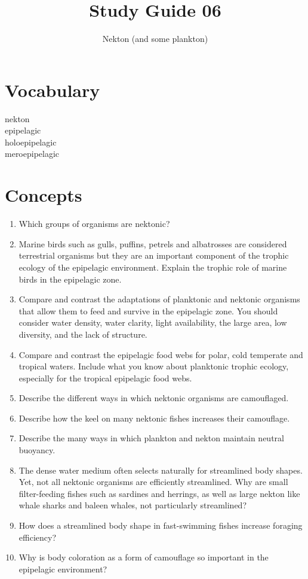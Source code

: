 \documentclass[nofonts, letterpaper]{tufte-handout}
\title{Study Guide 06}
\author{Nekton (and some plankton)}
\date{} %
\begin{document}
\maketitle	%


\section{Vocabulary}
\vspace{-1\baselineskip}
\begin{multicols}{2}
nekton \\
epipelagic \\
holoepipelagic \\
meroepipelagic
\end{multicols}

\section{Concepts}

\begin{enumerate}
\item
  Which groups of organisms are nektonic?
\item
  Marine birds such as gulls, puffins, petrels and albatrosses are
  considered terrestrial organisms but they are an important component
  of the trophic ecology of the epipelagic environment. Explain the
  trophic role of marine birds in the epipelagic zone.
\item
  Compare and contrast the adaptations of planktonic and nektonic
  organisms that allow them to feed and survive in the epipelagic zone.
  You should consider water density, water clarity, light availability,
  the large area, low diversity, and the lack of structure.
\item
  Compare and contrast the epipelagic food webs for polar, cold
  temperate and tropical waters. Include what you know about planktonic
  trophic ecology, especially for the tropical epipelagic food webs.
\item
  Describe the different ways in which nektonic organisms are
  camouflaged.
\item
  Describe how the keel on many nektonic fishes increases their
  camouflage.
\item
  Describe the many ways in which plankton and nekton maintain neutral
  buoyancy.
\item
  The dense water medium often selects naturally for streamlined body
  shapes. Yet, not all nektonic organisms are efficiently streamlined.
  Why are small filter-feeding fishes such as sardines and herrings, as
  well as large nekton like whale sharks and baleen whales, not
  particularly streamlined?
\item
  How does a streamlined body shape in fast-swimming fishes increase
  foraging efficiency?
\item
  Why is body coloration as a form of camouflage so important in the
  epipelagic environment?
 \end{enumerate}
\end{document}
